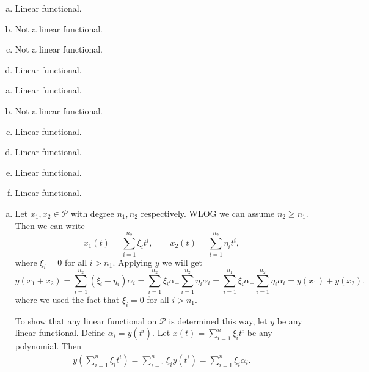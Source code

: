 \begin{problem}
	\begin{solution}
		\begin{enumerate}[(a)]
			\item Linear functional.
			\item Not a linear functional.
			\item Not a linear functional.
			\item Linear functional. 
		\end{enumerate}
	\end{solution}
\end{problem}


\begin{problem}
	\begin{solution}
		\begin{enumerate}[(a)]
			\item Linear functional.
			\item Not a linear functional.
			\item Linear functional.
			\item Linear functional.
			\item Linear functional.
			\item Linear functional.
		\end{enumerate}
	\end{solution}
\end{problem}

\begin{problem}
	\begin{solution}
		\begin{enumerate}[(a)]
			\item Let $ x_1,x_2 \in \mathcal{P} $ with degree $ n_1,n_2 $ respectively. WLOG we can assume $ n_2 \geq n_1 $. Then we can write
			\[ x_1(t) = \sum_{i=1}^{n_2} \xi_i t^i,\qquad x_2(t) = \sum_{i=1}^{n_2} \eta_i t^i, \]
			where $ \xi_i = 0 $ for all $ i>n_1 $. Applying $ y $ we will get
			\[ y(x_1+x_2) = \sum_{i=1}^{n_2} (\xi_i + \eta_i) \alpha_i = \sum_{i=1}^{n_2} \xi_i\alpha_ + \sum_{i=1}^{n_2} \eta_i \alpha_i = \sum_{i=1}^{n_1} \xi_i\alpha_ + \sum_{i=1}^{n_2} \eta_i \alpha_i = y(x_1) + y(x_2). \]
			where  we used the fact that $ \xi_i = 0 $ for all $ i>n_1 $.
			
			To show that any linear functional on $ \mathcal{P} $ is determined this way, let $ y $ be any linear functional. Define $ \alpha_i = y(t^i) $. Let $ x(t) = \sum_{i=1}^n \xi_i t^i $ be any polynomial. Then
			\begin{align*}
				y(\sum_{i=1}^n \xi_i t^i) = \sum_{i=1}^{n} \xi_i y(t^i) = \sum_{i=1}^{n} \xi_i \alpha_i.
			\end{align*}
		\end{enumerate}
	\end{solution}
\end{problem}


